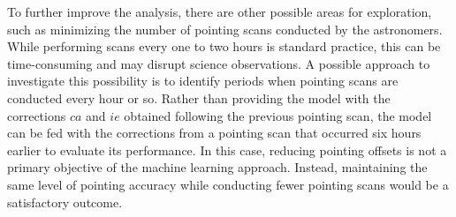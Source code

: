 To further improve the analysis, there are other possible areas for exploration, such as minimizing the number of pointing scans conducted by the astronomers.
While performing scans every one to two hours is standard practice, this can be time-consuming and may disrupt science observations.
A possible approach to investigate this possibility is to identify periods when pointing scans are conducted every hour or so.
Rather than providing the model with the corrections $ca$ and $ie$ obtained following the previous pointing scan, the model can be fed with the corrections from a pointing scan that occurred six hours earlier to evaluate its performance.
In this case, reducing pointing offsets is not a primary objective of the machine learning approach.
Instead, maintaining the same level of pointing accuracy while conducting fewer pointing scans would be a satisfactory outcome.\\




